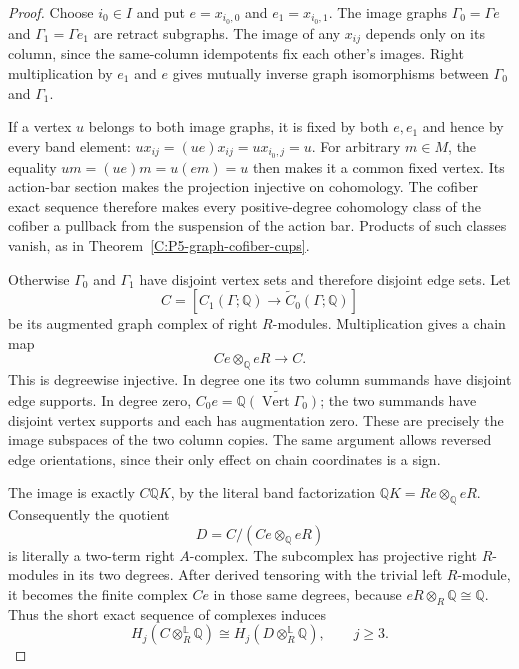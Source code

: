 \begin{proof}
Choose $i_0\in I$ and put $e=x_{i_0,0}$ and $e_1=x_{i_0,1}$.
The image graphs $\Gamma_0=\Gamma e$ and $\Gamma_1=\Gamma e_1$
are retract subgraphs.  The image of any $x_{ij}$ depends only
on its column, since the same-column idempotents fix each other's
images.  Right multiplication by $e_1$ and $e$ gives mutually
inverse graph isomorphisms between $\Gamma_0$ and $\Gamma_1$.

If a vertex $u$ belongs to both image graphs, it is fixed by
both $e,e_1$ and hence by every band element:
$ux_{ij}=(ue)x_{ij}=ux_{i_0,j}=u$.
For arbitrary $m\in M$, the equality
$um=(ue)m=u(em)=u$ then makes it a common fixed vertex.
Its action-bar section makes the projection injective on
cohomology.  The cofiber exact sequence therefore makes every
positive-degree cohomology class of the cofiber a pullback
from the suspension of the action bar.  Products of such
classes vanish, as in Theorem~\ref{C:P5-graph-cofiber-cups}.

Otherwise $\Gamma_0$ and $\Gamma_1$ have disjoint vertex sets
and therefore disjoint edge sets.  Let
\[
 C=[C_1(\Gamma;\mathbb Q)\longrightarrow
       \widetilde C_0(\Gamma;\mathbb Q)]
\]
be its augmented graph complex of right $R$-modules.  Multiplication
gives a chain map
\[
 C e\otimes_{\mathbb Q}eR\longrightarrow C.
\]
This is degreewise injective.  In degree one its two column
summands have disjoint edge supports.  In degree zero,
$C_0e=\widetilde{\mathbb Q(\operatorname{Vert}\Gamma_0)}$;
the two summands have disjoint vertex supports and each has
augmentation zero.  These are precisely the image subspaces of
the two column copies.  The same argument allows reversed edge
orientations, since their only effect on chain coordinates is a
sign.

The image is exactly $C\mathbb QK$, by the literal band
factorization $\mathbb QK=Re\otimes_{\mathbb Q}eR$.
Consequently the quotient
\[
 D=C/(Ce\otimes_{\mathbb Q}eR)
\]
is literally a two-term right $A$-complex.  The subcomplex has
projective right $R$-modules in its two degrees.  After derived
tensoring with the trivial left $R$-module, it becomes the finite
complex $Ce$ in those same degrees, because $eR\otimes_R\mathbb Q
\cong\mathbb Q$.  Thus the short exact sequence of complexes
induces
\[
 H_j(C\otimes_R^{\mathbb L}\mathbb Q)
 \cong H_j(D\otimes_R^{\mathbb L}\mathbb Q),
 \qquad j\geq3.
\]


\end{proof}
